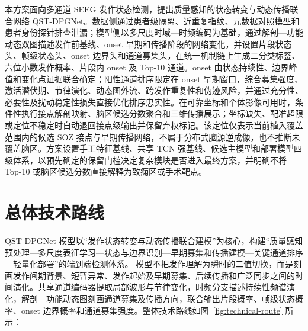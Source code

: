\documentclass{cumcmthesis}
\numberwithin{figure}{section} %
\numberwithin{table}{section} %
\begin{document}
	
\normalem

\maketitle
 
\newpage
\thispagestyle{empty}
\tableofcontents
\newpage
 
\thispagestyle{empty}
\listoffigures
\newpage

\thispagestyle{empty}
\listoftables
\newpage

\setcounter{page}{1}
 
\begin{cnabstract}

本方案面向多通道 SEEG 发作状态检测，提出质量感知的状态转变与动态传播联合网络 QST-DPGNet。数据侧通过患者级隔离、近重复指纹、元数据对照模型和患者身份探针排查泄漏；模型侧以多尺度时域—时频编码为基础，通过解剖—功能动态双图描述发作前基线、onset 早期和传播阶段的网络变化，并设置片段状态头、帧级状态头、onset 边界头和通道募集头，在统一机制链上生成二分类标签、六位小数发作概率、片段内 onset 及 Top-10 通道。onset 由状态持续性、边界峰值和变化点证据联合确定；阳性通道排序限定在 onset 早期窗口，综合募集强度、激活潜伏期、节律演化、动态图外流、跨发作重复性和伪迹风险，并通过充分性、必要性及扰动稳定性损失直接优化排序忠实性。在可靠坐标和个体影像可用时，条件性执行接点解剖映射、脑区候选分数聚合和三维传播展示；坐标缺失、配准超限或定位不稳定时自动退回接点级输出并保留弃权标记。该定位仅表示当前植入覆盖范围内的候选 SOZ 接点与早期传播网络，不属于分布式脑源逆成像，也不推断未覆盖脑区。方案设置手工特征基线、共享 TCN 强基线、候选主模型和部署模型四级体系，以预先确定的保留门槛决定复杂模块是否进入最终方案，并明确不将 Top-10 或脑区候选分数直接解释为致痫区或手术靶点。

	
\end{cnabstract}

\clearpage


\section{总体技术路线}

QST-DPGNet 模型以“发作状态转变与动态传播联合建模”为核心，构建“质量感知预处理—多尺度表征学习—状态与边界识别—早期募集和传播建模—关键通道排序—轻量化部署”的端到端检测体系。
模型不把发作理解为瞬时的二值切换，而是刻画发作间期背景、短暂异常、发作起始及早期募集、后续传播和广泛同步之间的时间演化。共享通道编码器提取局部波形与节律变化，时频分支描述持续性频谱演化，解剖—功能动态图刻画通道募集及传播方向，联合输出片段概率、帧级状态概率、onset 边界概率和通道募集强度。整体技术路线如图~\ref{fig:technical-route} 所示：
\end{document}
